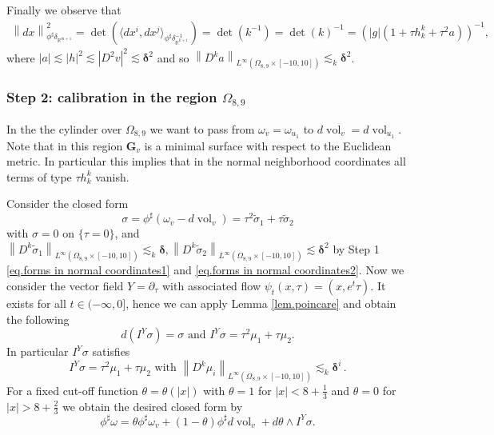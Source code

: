 \documentclass[reqno]{amsart}
\theoremstyle{definition}
\theoremstyle{remark}
\numberwithin{equation}{section}
\newcommand{\norm}[1]{\left\lVert#1\right\rVert}
\newcommand{\R}{\mathbb{R}}
\newcommand{\bG}{\mathbf{G}} %
\begin{document}
Finally we observe that 
\begin{align}\label{eq.norm of dx in normal coordinates}
    \norm{dx}^2_{\phi^\sharp\delta_{\R^{m+1}}} = \det\left(\langle dx^i,dx^j\rangle_{\phi^\sharp \delta_{\R^{k+1}}^{-1}}\right)= \det(k^{-1}) = \det(k)^{-1} = \left(|g| (1 + \tau h^k_k + \tau^2 a) \right)^{-1}, 
\end{align}
where $|a|\lesssim |h|^2 \lesssim |D^2v|^2\lesssim \boldsymbol{\delta}^2$ and so $\norm{D^ka}_{L^\infty(\Omega_{8,9}\times [-10,10])}\lesssim_k \boldsymbol{\delta}^2$.

\subsubsection*{Step 2: calibration in the region $\Omega_{8,9}$} In the the cylinder over $\Omega_{8,9}$ we want to pass from $\omega_v=\omega_{u_1}$ to $d\operatorname{vol}_v=d\operatorname{vol}_{u_1}$. Note that in this region $\bG_{v}$ is a minimal surface with respect to the Euclidean metric. In particular this implies that in the normal neighborhood coordinates all terms of type $\tau h^k_k$ vanish. 

Consider the closed form 
\[\sigma = \phi^{\sharp}\left(\omega_v - d\operatorname{vol}_v\right) = \tau^2 \tilde{\sigma}_1 + \tau \tilde{\sigma}_2\]
with $\sigma =0$ on $\{\tau =0\}$, and $\norm{D^k\tilde{\sigma}_1}_{L^\infty(\Omega_{8,9}\times [-10,10])}\lesssim_k \boldsymbol{\delta}, \norm{D^k\tilde{\sigma}_2}_{L^\infty(\Omega_{8,9}\times [-10,10])}\lesssim \boldsymbol{\delta}^2 $ by Step 1 \eqref{eq.forms in normal coordinates1} and \eqref{eq.forms in normal coordinates2}.
Now we consider the vector field $Y= \partial_\tau$ with associated flow $\psi_t(x,\tau)=(x,e^t\tau)$. It exists for all $t\in (-\infty, 0]$, hence we can apply Lemma \ref{lem.poincare} and obtain the following 
\[ d (I^Y\sigma) = \sigma \text{ and } I^Y\sigma = \tau^2 \mu_1 + \tau\mu_2. \]
In particular $I^Y \sigma$ satisfies 
\begin{equation}\label{eq.estimates on I^Ysigma}
    I^Y\sigma = \tau^2 \mu_1 + \tau\mu_2 \text{ with } \norm{D^k\mu_i}_{L^\infty(\Omega_{8,9}\times[-10,10])}\lesssim_k \boldsymbol{\delta}^i\,.
\end{equation}
For a fixed cut-off function $\theta=\theta(|x|)$ with $\theta=1$ for $|x|<8+\frac13$ and $\theta=0$ for $|x|> 8 +\frac23$ we obtain the desired closed form by 
\begin{equation}\label{eq.the callibration form in Omega89}
    \phi^\sharp\omega = \theta \phi^\sharp \omega_v + (1-\theta) \phi^\sharp d\operatorname{vol}_v +d\theta \wedge I^Y \sigma.
\end{equation}
\end{document}
